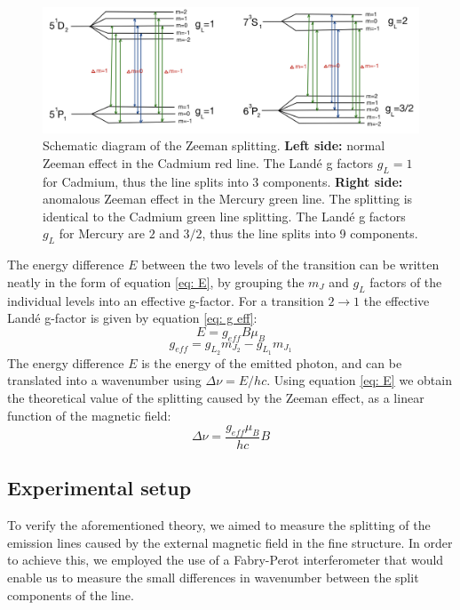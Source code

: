 \documentclass[11pt]{article}
\begin{document}
\begin{figure}[h!]
    \centering
    \includegraphics[width=\linewidth]{Energy levels.png}
    \captionsetup{justification=centering}
    \caption{Schematic diagram of the Zeeman splitting. 
    \textbf{Left side:} normal Zeeman effect in the Cadmium red line. The Landé g factors $g_L = 1$ for Cadmium, thus the line splits into 3 components. 
    \textbf{Right side:} anomalous Zeeman effect in the Mercury green line. The splitting is identical to the Cadmium green line splitting. The Landé g factors $g_L$ for Mercury are $2$ and $3/2$, thus the line splits into 9 components. }
    \label{fig: energy levels}
\end{figure}
The energy difference $E$ between the two levels of the transition can be written neatly in the form of equation \eqref{eq: E}, by grouping the $m_J$ and $g_L$ factors of the individual levels into an effective g-factor. For a transition $2 \rightarrow 1$ the effective Landé g-factor is given by equation \eqref{eq: g eff}: 
\begin{equation}
    E = g_{eff} B \mu_B \label{eq: E}
\end{equation}
\begin{equation}
    g_{eff} = g_{L_2} m_{J_2} - g_{L_1} m_{J_1} \label{eq: g eff}
\end{equation}
The energy difference $E$ is the energy of the emitted photon, and can be translated into a wavenumber using $\Delta \nu = E / hc$. Using equation \eqref{eq: E} we obtain the theoretical value of the splitting caused by the Zeeman effect, as a linear function of the magnetic field: 
\begin{equation}
    \Delta \nu = \frac{g_{eff} \mu_B}{hc} B
    \label{eq: splitting}
\end{equation}



\subsection{Experimental setup} \label{sec: aparatus}
To verify the aforementioned theory, we aimed to measure the splitting of the emission lines caused by the external magnetic field in the fine structure. In order to achieve this, we employed the use of a Fabry-Perot interferometer that would enable us to measure the small differences in wavenumber between the split components of the line. 
\end{document}
